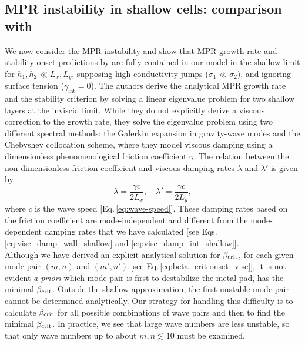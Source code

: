 \documentclass[aps,prfluids,reprint,superscriptaddress]{revtex4-2}
\newcommand{\ii}[1]{\text{#1}}
\begin{document}
\subsection{MPR instability in shallow cells: comparison with \citet{Politis2021}}
\label{sec:fractal}
We now consider the MPR instability and show that MPR growth rate and stability onset predictions by \citet{Politis2021} are fully contained in our model in the shallow limit for $h_1 ,h_2 \ll L_x, L_y$, supposing high conductivity jumps ($\sigma_1 \ll \sigma_2$), and ignoring surface tension ($\gamma_{\ii{int}} = 0$). The authors derive the analytical MPR growth rate and the stability criterion by solving a linear eigenvalue problem for two shallow layers at the inviscid limit. While they do not explicitly derive a viscous correction to the growth rate, they solve the eigenvalue problem using two different spectral methods: the Galerkin expansion in gravity-wave modes and the Chebyshev collocation scheme, where they model viscous damping using a dimensionless phenomenological friction coefficient $\gamma$. The relation between the non-dimensionless friction coefficient and viscous damping rates $\lambda$ and $\lambda'$ is given by
\begin{equation}
	\lambda = \frac{\gamma c}{2L_x}, \quad \lambda'=\frac{\gamma c}{2L_y},
	\label{eq:fricton_coeff}
\end{equation}
where $c$ is the wave speed [Eq.\,\eqref{eq:wave-speed}]. These damping rates based on the friction coefficient are mode-independent and different from the mode-dependent damping rates that we have calculated [see Eqs.\,\eqref{eq:visc_damp_wall_shallow} and \eqref{eq:visc_damp_int_shallow}].
\\
\indent Although we have derived an explicit analytical solution for $\beta_{\rm crit}$, for each given mode pair $(m,n)$ and $(m',n')$ [see Eq.\,\eqref{eq:beta_crit-onset_visc}], it is not evident \textit{a priori} which mode pair is first to destabilize the metal pad, has the minimal $\beta_{\rm crit}$. Outside the shallow approximation, the first unstable mode pair cannot be determined analytically. Our strategy for handling this difficulty is to calculate $\beta_{\rm crit}$ for all possible combinations of wave pairs and then to find the minimal $\beta_{\rm crit}$. In practice, we see that large wave numbers are less unstable, so that only wave numbers up to about $m,n \lesssim 10$ must be examined.
\end{document}
